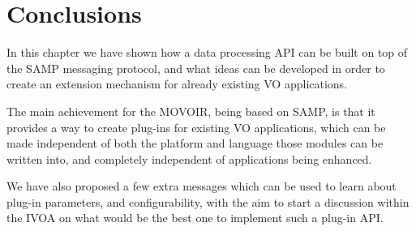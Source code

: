 	
	\section{Conclusions} %
	\label{sec:movoir_conclusions}
		
		In this chapter we have shown how a data processing API
		can be built on top of the SAMP messaging protocol, and
		what ideas can be developed in order to create an
		extension mechanism for already existing VO applications.
		
		The main achievement for the MOVOIR, being based on
		SAMP, is that it provides a way to create plug-ins for
		existing VO applications, which can be made independent of
		both the platform and language those modules can be written
		into, and completely independent of applications being
		enhanced.
		
		We have also proposed a few extra messages which can be
		used to learn about plug-in parameters, and configurability,
		with the aim to start a discussion within the IVOA on
		what would be the best one to implement such a plug-in
		API.
		
	
